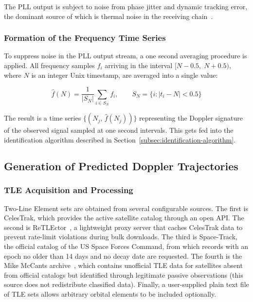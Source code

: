 \documentclass[lineno,pdflatex,sn-basic,referee,]{sn-jnl}
\begin{document}
The PLL output is subject to noise from phase jitter and dynamic tracking error, the dominant source of which is thermal noise in the receiving chain~\citep{kaplan2006}.

\subsubsection{Formation of the Frequency Time Series}
\label{subsubsec:freq-timeseries}

To suppress noise in the PLL output stream, a one second averaging procedure is applied. All frequency samples $f_i$ arriving in the interval $[N - 0.5,\; N + 0.5)$, where $N$ is an integer Unix timestamp, are averaged into a single value:

\begin{equation}
    \hat{f}(N) = \frac{1}{|S_N|} \sum_{i \in S_N} f_i,
    \qquad S_N = \{i : |t_i - N| < 0.5\}
    \label{eq:averaging}
\end{equation}

The result is a time series $\{(N_j,\, \hat{f}(N_j))\}$ representing the Doppler signature of the observed signal sampled at one second intervals. This gets fed into the identification algorithm described in Section~\ref{subsec:identification-algorithm}.

\subsection{Generation of Predicted Doppler Trajectories}
\label{subsec:predicted-trajectories}

\subsubsection{TLE Acquisition and Processing}
\label{subsubsec:tle-processing}

Two-Line Element sets are obtained from several configurable sources. The first is CelesTrak, which provides the active satellite catalog through an open API. The second is ReTLEctor~\citep{retlector}, a lightweight proxy server that caches CelesTrak data to prevent rate-limit violations during bulk downloads. The third is Space-Track, the official catalog of the US Space Forces Command, from which records with an epoch no older than 14 days and no decay date are requested. The fourth is the Mike McCants archive~\citep{mmccants}, which contains unofficial TLE data for satellites absent from official catalogs but identified through legitimate passive observations (this source does not redistribute classified data). Finally, a user-supplied plain text file of TLE sets allows arbitrary orbital elements to be included optionally.
\end{document}
